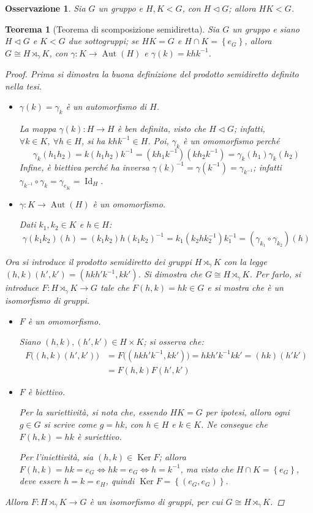 \documentclass[11pt]{scrartcl}
\theoremstyle{style1}
\newtheorem{osservazione}{Osservazione}[section]
\newtheorem{teorema}{Teorema}[section]
\numberwithin{equation}{subsection}
\begin{document}
\begin{osservazione}
	Sia $G$ un gruppo e $H,K < G$, con $H \lhd G$; allora $HK < G$.
\end{osservazione}
\begin{teorema}
	[Teorema di scomposizione semidiretta]\label{scth}
	Sia $G$ un gruppo e siano $H \lhd G$ e $K < G$ due sottogruppi; se $HK = G$ e $H \cap K = \left\{ e_G \right\} $, allora $G \cong H \rtimes _\gamma K$, con $\gamma: K \to \operatorname{Aut} (H)$ e $\gamma(k) = k hk^{-1}$.
	\begin{proof}
		Prima si dimostra la buona definizione del prodotto semidiretto definito nella tesi.
		\begin{itemize}
			\item $\gamma(k)=\gamma_k$ \`e un automorfismo di $H$.

				La mappa $\gamma(k):H\to H$ \`e ben definita, visto che $H\lhd G$; infatti, $\forall k \in  K, \ \forall h \in H$, si ha $k h k^{-1}\in H$.
				Poi, $\gamma_k$ \`e un omomorfismo perch\'e
				\[
				\gamma_k (h_1h_2) = k (h_1h_2) k^{-1} = (kh_1k^{-1})(k h_2k^{-1}) = \gamma_k(h_1) \gamma_k(h_2)
				\] 
				Infine, \`e biettiva perch\'e ha inversa $\gamma(k)^{-1} =\gamma(k^{-1})= \gamma_{k^{-1}} $; infatti $\gamma_{k^{-1}} \circ \gamma_k = \gamma_{e_K}  = \operatorname{Id} _H$.
			\item $\gamma : K \to \operatorname{Aut} (H)$ \`e un omomorfismo.

				Dati $k_1,k_2 \in K$ e $h \in H$:
\[
\gamma(k_1k_2)(h) = (k_1k_2)h(k_1k_2)^{-1} = k_1(k_2hk_2^{-1})k_1^{-1}= (\gamma_{k_1} \circ \gamma_{k_2} )(h)
\] 
		\end{itemize}
		Ora si introduce il prodotto semidiretto dei gruppi $H \rtimes _\gamma K$ con la legge $(h,k)(h',k') = (hkh'k^{-1},k k')$.
		Si dimostra che $G \cong H \rtimes _\gamma K$.
		Per farlo, si introduce $F : H \rtimes _\gamma K \to G$ tale che $F(h,k) = hk \in G$ e si mostra che \`e un isomorfismo di gruppi.
		\begin{itemize}
			\item $F$ \`e un omomorfismo.

				Siano $(h,k), (h',k') \in H \times K$; si osserva che:
				\[
					\begin{split}
						F\big((h,k)(h',k')\big) &= F\big((hkh'k^{-1},k k')\big) = hkh'k^{-1} k k'= (hk)(h'k')\\
									&= F(h,k) F(h',k')
					\end{split}
				\] 
			\item $F$ \`e biettivo.

				Per la suriettivit\`a, si nota che, essendo $HK = G$ per ipotesi, allora ogni $g \in G$ si scrive come $g = hk$, con $h \in H$ e $k \in K$.
				Ne consegue che $F(h,k) = hk$ \`e suriettivo.

				Per l'iniettivit\`a, sia $(h,k) \in \operatorname{Ker} F$; allora $F(h,k) = hk = e_G \iff hk = e_G \iff h = k^{-1}$, ma visto che $H\cap K = \left\{ e_G \right\} $, deve essere $h=k = e_H$, quindi $\operatorname{Ker} F = \left\{ (e_G,e_G) \right\} $.
		\end{itemize}
	Allora $F: H\rtimes _\gamma K \to G$ \`e un isomorfismo di gruppi, per cui $G \cong H \rtimes _\gamma K$.
	\end{proof}
\end{teorema}
\end{document}
